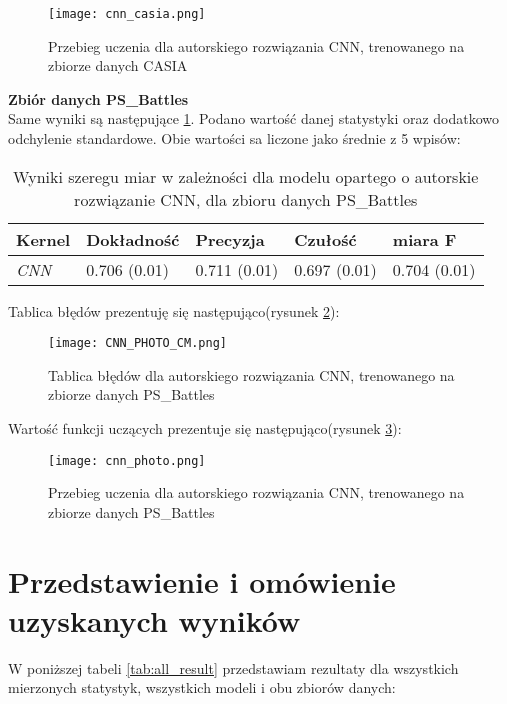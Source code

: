 \begin{figure}[H]
	\texttt{[image: cnn\_casia.png]}
	\centering
	\caption{Przebieg uczenia dla autorskiego rozwiązania CNN, trenowanego na zbiorze danych CASIA}
	\label{fig:cnn_learn_casia}
\end{figure}

\textbf{Zbiór danych PS\_Battles} \\

Same wyniki są następujące \ref{tab:result_p_cnn}. Podano wartość danej statystyki oraz dodatkowo odchylenie standardowe. Obie wartości sa liczone jako średnie z 5 wpisów:
\begin{table}[H]
	\centering
	\begin{tabular}{|l|l|l|l|l|}
		\hline
		\textbf{Kernel} & \textbf{Dokładność} & \textbf{Precyzja} & \textbf{Czułość} & \textbf{miara F} \\ \hline
		\textit{CNN}  & 0.706 (0.01) & 0.711 (0.01) & 0.697 (0.01) & 0.704 (0.01) \\ \hline
	\end{tabular}
	\caption{Wyniki szeregu miar w zależności dla modelu opartego o autorskie rozwiązanie CNN, dla zbioru danych PS\_Battles}
	\label{tab:result_p_cnn}
\end{table}

Tablica błędów prezentuję się następująco(rysunek \ref{fig:cnn_cm_photo}):

\begin{figure}[H]
	\texttt{[image: CNN\_PHOTO\_CM.png]}
	\centering
	\caption{Tablica błędów dla autorskiego rozwiązania CNN, trenowanego na zbiorze danych PS\_Battles}
	\label{fig:cnn_cm_photo}
\end{figure}

Wartość funkcji uczących prezentuje się następująco(rysunek \ref{fig:cnn_learn_photo}):

\begin{figure}[H]
	\texttt{[image: cnn\_photo.png]}
	\centering
	\caption{Przebieg uczenia dla autorskiego rozwiązania CNN, trenowanego na zbiorze danych PS\_Battles}
	\label{fig:cnn_learn_photo}
\end{figure}

\section {Przedstawienie i omówienie uzyskanych wyników}

W poniższej tabeli \ref{tab:all_result} przedstawiam rezultaty dla wszystkich mierzonych statystyk, wszystkich modeli i obu zbiorów danych:

